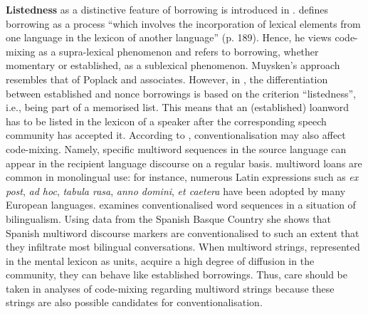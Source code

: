 \textbf{Listedness} as a distinctive feature of borrowing is introduced in \citet{milroy-code-switching-1995}. \citet{milroy-code-switching-1995} defines borrowing as a process ``which involves the incorporation of lexical elements from one language in the lexicon of another language'' (p. 189). Hence, he views code-mixing as a supra-lexical phenomenon and refers to borrowing, whether momentary or established, as a sublexical phenomenon. Muysken's approach resembles that of Poplack and associates. However, in \citet{milroy-code-switching-1995, muysken-bilingual-2000}, the differentiation between established and nonce borrowings is based on the criterion ``listedness'', i.e., being part of a memorised list. This means that an (established) loanword has to be listed in the lexicon of a speaker after the corresponding speech community has accepted it. According to \citet{milroy-code-switching-1995, muysken-bilingual-2000}, conventionalisation may also affect code-mixing. Namely, specific multiword sequences in the source language can appear in the recipient language discourse on a regular basis. multiword loans are common in monolingual use: for instance, numerous Latin expressions such as \textit{ex post}, \textit{ad hoc}, \textit{tabula rasa}, \textit{anno domini}, \textit{et caetera} have been adopted by many European languages. \citet{lantto2015} examines conventionalised word sequences in a situation of bilingualism. Using data from the Spanish Basque Country she shows that Spanish multiword discourse markers are conventionalised to such an extent that they infiltrate most bilingual conversations. When multiword strings, represented in the mental lexicon as units, acquire a high degree of diffusion in the community, they can behave like established borrowings. Thus, care should be taken in analyses of code-mixing regarding multiword strings because these strings are also possible candidates for conventionalisation.

